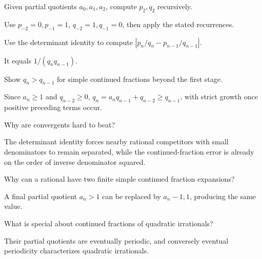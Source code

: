 \begin{problem}\label{prob:ii25-problem-04}
Given partial quotients $a_0,a_1,a_2$, compute $p_2,q_2$ recursively.
\end{problem}
\begin{solution}
Use $p_{-2}=0,p_{-1}=1$, $q_{-2}=1,q_{-1}=0$, then apply the stated recurrences.
\end{solution}

\begin{problem}\label{prob:ii25-problem-05}
Use the determinant identity to compute $|p_n/q_n-p_{n-1}/q_{n-1}|$.
\end{problem}
\begin{solution}
It equals $1/(q_nq_{n-1})$.
\end{solution}

\begin{problem}\label{prob:ii25-problem-06}
Show $q_n>q_{n-1}$ for simple continued fractions beyond the first stage.
\end{problem}
\begin{solution}
Since $a_n\ge1$ and $q_{n-2}\ge0$, $q_n=a_nq_{n-1}+q_{n-2}\ge q_{n-1}$, with strict growth once positive preceding terms occur.
\end{solution}

\begin{problem}\label{prob:ii25-problem-07}
Why are convergents hard to beat?
\end{problem}
\begin{solution}
The determinant identity forces nearby rational competitors with small denominators to remain separated, while the continued-fraction error is already on the order of inverse denominator squared.
\end{solution}

\begin{problem}\label{prob:ii25-problem-08}
Why can a rational have two finite simple continued fraction expansions?
\end{problem}
\begin{solution}
A final partial quotient $a_n>1$ can be replaced by $a_n-1,1$, producing the same value.
\end{solution}

\begin{problem}\label{prob:ii25-problem-09}
What is special about continued fractions of quadratic irrationals?
\end{problem}
\begin{solution}
Their partial quotients are eventually periodic, and conversely eventual periodicity characterizes quadratic irrationals.
\end{solution}

